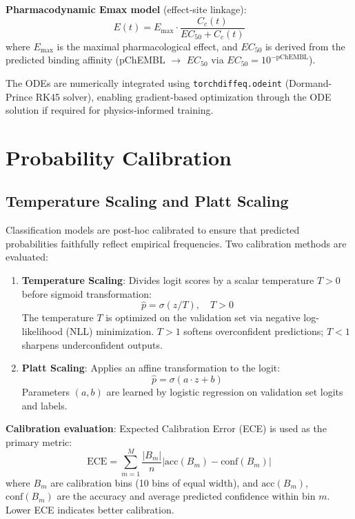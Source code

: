 \documentclass[a4paper,11pt,twoside]{report}
\begin{document}
\noindent \textbf{Pharmacodynamic Emax model} (effect-site linkage):
\begin{equation}
E(t) = E_{\max} \cdot \frac{C_c(t)}{EC_{50} + C_c(t)}
\end{equation}
where $E_{\max}$ is the maximal pharmacological effect, and $EC_{50}$ is derived from the predicted binding affinity (pChEMBL $\to$ $EC_{50}$ via $EC_{50} = 10^{-\text{pChEMBL}}$).

\noindent The ODEs are numerically integrated using \texttt{torchdiffeq.odeint} (Dormand-Prince RK45 solver), enabling gradient-based optimization through the ODE solution if required for physics-informed training.

\section{Probability Calibration}

\subsection{Temperature Scaling and Platt Scaling}

Classification models are post-hoc calibrated to ensure that predicted probabilities faithfully reflect empirical frequencies. Two calibration methods are evaluated:

\begin{enumerate}
  \item \textbf{Temperature Scaling}: Divides logit scores by a scalar temperature $T > 0$ before sigmoid transformation:
  \begin{equation}
    \hat{p} = \sigma(z / T), \quad T > 0
  \end{equation}
  The temperature $T$ is optimized on the validation set via negative log-likelihood (NLL) minimization. $T > 1$ softens overconfident predictions; $T < 1$ sharpens underconfident outputs.

  \item \textbf{Platt Scaling}: Applies an affine transformation to the logit:
  \begin{equation}
    \hat{p} = \sigma(a \cdot z + b)
  \end{equation}
  Parameters $(a, b)$ are learned by logistic regression on validation set logits and labels.
\end{enumerate}

\noindent \textbf{Calibration evaluation}: Expected Calibration Error (ECE) is used as the primary metric:
\begin{equation}
\text{ECE} = \sum_{m=1}^{M} \frac{|B_m|}{n} \left|\text{acc}(B_m) - \text{conf}(B_m)\right|
\end{equation}
where $B_m$ are calibration bins (10 bins of equal width), and $\text{acc}(B_m)$, $\text{conf}(B_m)$ are the accuracy and average predicted confidence within bin $m$. Lower ECE indicates better calibration.
\end{document}

